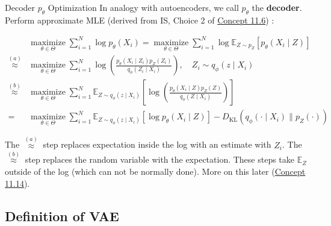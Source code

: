 \begin{frame}[allowframebreaks]

\begin{myconceptblock}{11.12}{Decoder $p_{\theta}$ Optimization}
    In analogy with autoencoders, we call $p_{\theta}$ the \textbf{decoder}.
    Perform approximate MLE (derived from IS, Choice 2 of \hyperref[concept:11.6]{Concept 11.6}) :

    $$
    \begin{aligned}
    & \underset{\theta \in \Theta}{\operatorname{maximize}} \sum_{i=1}^{N} \log p_{\theta}\left(X_{i}\right)=\underset{\theta \in \Theta}{\operatorname{maximize}} \sum_{i=1}^{N} \log \mathbb{E}_{Z \sim p_{Z}}\left[p_{\theta}\left(X_{i} \mid Z\right)\right] \\
    \stackrel{(a)}{\approx} & \underset{\theta \in \Theta}{\operatorname{maximize}} \sum_{i=1}^{N} \log \left(\frac{p_{\theta}\left(X_{i} \mid Z_{i}\right) p_{Z}\left(Z_{i}\right)}{q_{\phi}\left(Z_{i} \mid X_{i}\right)}\right), \quad Z_{i} \sim q_{\phi}\left(z \mid X_{i}\right) \\
    \stackrel{(b)}{\approx} & \underset{\theta \in \Theta}{\operatorname{maximize}} \sum_{i=1}^{N} \mathbb{E}_{Z \sim q_{\phi}\left(z \mid X_{i}\right)}\left[\log \left(\frac{p_{\theta}\left(X_{i} \mid Z\right) p_{Z}(Z)}{q_{\phi}\left(Z \mid X_{i}\right)}\right)\right] \\
    = & \underset{\theta \in \Theta}{\operatorname{maximize}} \sum_{i=1}^{N} \mathbb{E}_{Z \sim q_{\phi}\left(z \mid X_{i}\right)}\left[\log p_{\theta}\left(X_{i} \mid Z\right)\right]-D_{\mathrm{KL}}\left(q_{\phi}\left(\cdot \mid X_{i}\right) \| p_{Z}(\cdot)\right)
    \end{aligned}
    $$

    The $\stackrel{(a)}{\approx}$ step replaces expectation inside the log with an estimate with $Z_{i}$.
    The $\stackrel{(b)}{\approx}$ step replaces the random variable with the expectation.
    These steps take $\mathbb{E}_{Z}$ outside of the log (which can not be normally done).
    More on this later (\hyperref[concept:11.14]{Concept 11.14}).
\end{myconceptblock}

\end{frame}

\subsection{Definition of VAE}

